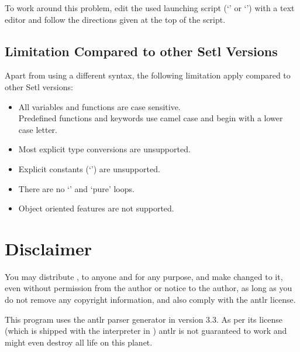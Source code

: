 To work around this problem, edit the used launching script (`' or `') with a text editor and follow the directions given at the top of the script.

\subsection{Limitation Compared to other Setl Versions}

Apart from using a different syntax, the following limitation apply compared to other Setl versions:

\begin{itemize}
	\item All variables and functions are case sensitive.\\
        Predefined functions and keywords use camel case and begin with a lower case letter.
    \item Most explicit type conversions are unsupported.
    \item Explicit constants (`') are unsupported.
    \item There are no `' and `pure' loops.
    \item Object oriented features are not supported.
\end{itemize}

%


\section{Disclaimer}
You may distribute \setlX{}, to anyone and for any purpose, and make changed to it, even without permission from the author or notice to the author, as long as you do not remove any copyright information, and also comply with the antlr license.

This program uses the antlr parser generator in version 3.3. As per its license (which is shipped with the interpreter in ) antlr is not guaranteed to work and might even destroy all life on this planet.


